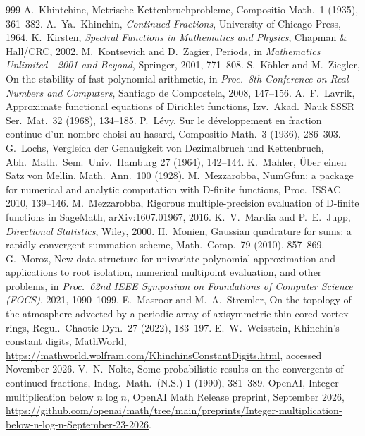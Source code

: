 \documentclass[11pt,reqno]{amsart}
\theoremstyle{definition}
\theoremstyle{remark}
\begin{document}
\begin{thebibliography}{999}
 A.~Khintchine, Metrische Kettenbruchprobleme, Compositio Math.\ 1 (1935), 361--382.
 A.~Ya.~Khinchin, \emph{Continued Fractions}, University of Chicago Press, 1964.
 K.~Kirsten, \emph{Spectral Functions in Mathematics and Physics}, Chapman \& Hall/CRC, 2002.
 M.~Kontsevich and D.~Zagier, Periods, in \emph{Mathematics Unlimited---2001 and Beyond}, Springer, 2001, 771--808.
 S.~K\"ohler and M.~Ziegler, On the stability of fast polynomial arithmetic, in \emph{Proc.\ 8th Conference on Real Numbers and Computers}, Santiago de Compostela, 2008, 147--156.
 A.~F.~Lavrik, Approximate functional equations of Dirichlet functions, Izv.\ Akad.\ Nauk SSSR Ser.\ Mat.\ 32 (1968), 134--185.
 P.~L\'evy, Sur le d\'eveloppement en fraction continue d'un nombre choisi au hasard, Compositio
Math.\ 3 (1936), 286--303.
 G.~Lochs, Vergleich der Genauigkeit von Dezimalbruch und Kettenbruch, Abh.\ Math.\ Sem.\ Univ.\
Hamburg 27 (1964), 142--144.
 K.~Mahler, \"Uber einen Satz von Mellin, Math.\ Ann.\ 100 (1928).
\bibitem{Mez10} M.~Mezzarobba, NumGfun: a package for numerical and analytic computation with D-finite functions, Proc.\ ISSAC 2010, 139--146.
\bibitem{Mez16} M.~Mezzarobba, Rigorous multiple-precision evaluation of D-finite functions in SageMath, arXiv:1607.01967, 2016.
\bibitem{MJ00} K.~V.~Mardia and P.~E.~Jupp, \emph{Directional Statistics}, Wiley, 2000.
\bibitem{Mon10} H.~Monien, Gaussian quadrature for sums: a rapidly convergent summation scheme, Math.\ Comp.\ 79 (2010), 857--869.
\bibitem{Mor21} G.~Moroz, New data structure for univariate polynomial approximation and applications to root isolation, numerical multipoint evaluation, and other problems, in \emph{Proc.\ 62nd IEEE Symposium on Foundations of Computer Science (FOCS)}, 2021, 1090--1099.
\bibitem{MS22} E.~Masroor and M.~A.~Stremler, On the topology of the atmosphere advected by a periodic array of axisymmetric thin-cored vortex rings, Regul.\ Chaotic Dyn.\ 27 (2022), 183--197.
\bibitem{MWKdigits} E.~W.~Weisstein, Khinchin's constant digits, MathWorld, \url{https://mathworld.wolfram.com/KhinchinsConstantDigits.html}, accessed November 2026.
\bibitem{Nol90} V.~N.~Nolte, Some probabilistic results on the convergents of continued fractions, Indag.\ Math.\ (N.S.) 1 (1990), 381--389.
\bibitem{OAI26} OpenAI, Integer multiplication below $n\log n$, OpenAI Math Release preprint, September 2026, \url{https://github.com/openai/math/tree/main/preprints/Integer-multiplication-below-n-log-n-September-23-2026}.

\end{thebibliography}
\end{document}
